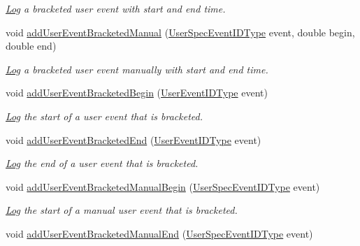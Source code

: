 \begin{DoxyCompactItemize}
\begin{DoxyCompactList}\small\item\em \hyperlink{structvt_1_1trace_1_1_log}{Log} a bracketed user event with start and end time. \end{DoxyCompactList}\item 
void \hyperlink{structvt_1_1trace_1_1_trace_ab0dd676ca3870682b0c52669d3603c11}{add\+User\+Event\+Bracketed\+Manual} (\hyperlink{namespacevt_1_1trace_a70c43e0e1596eea236912d4197d3120a}{User\+Spec\+Event\+I\+D\+Type} event, double begin, double end)
\begin{DoxyCompactList}\small\item\em \hyperlink{structvt_1_1trace_1_1_log}{Log} a bracketed user event manually with start and end time. \end{DoxyCompactList}\item 
void \hyperlink{structvt_1_1trace_1_1_trace_a1264ea508298bfeb6a6ef5e06d9214f9}{add\+User\+Event\+Bracketed\+Begin} (\hyperlink{namespacevt_1_1trace_a5908920d051c144c89f17c69ed262350}{User\+Event\+I\+D\+Type} event)
\begin{DoxyCompactList}\small\item\em \hyperlink{structvt_1_1trace_1_1_log}{Log} the start of a user event that is bracketed. \end{DoxyCompactList}\item 
void \hyperlink{structvt_1_1trace_1_1_trace_a9ed44cd0fb5939013ae30de2aeb8aa0e}{add\+User\+Event\+Bracketed\+End} (\hyperlink{namespacevt_1_1trace_a5908920d051c144c89f17c69ed262350}{User\+Event\+I\+D\+Type} event)
\begin{DoxyCompactList}\small\item\em \hyperlink{structvt_1_1trace_1_1_log}{Log} the end of a user event that is bracketed. \end{DoxyCompactList}\item 
void \hyperlink{structvt_1_1trace_1_1_trace_ab6def24560e35a011beb771b2a05894c}{add\+User\+Event\+Bracketed\+Manual\+Begin} (\hyperlink{namespacevt_1_1trace_a70c43e0e1596eea236912d4197d3120a}{User\+Spec\+Event\+I\+D\+Type} event)
\begin{DoxyCompactList}\small\item\em \hyperlink{structvt_1_1trace_1_1_log}{Log} the start of a manual user event that is bracketed. \end{DoxyCompactList}\item 
void \hyperlink{structvt_1_1trace_1_1_trace_a5de97038ac60bfcdf868c3f32637ef9e}{add\+User\+Event\+Bracketed\+Manual\+End} (\hyperlink{namespacevt_1_1trace_a70c43e0e1596eea236912d4197d3120a}{User\+Spec\+Event\+I\+D\+Type} event)

\end{DoxyCompactItemize}
